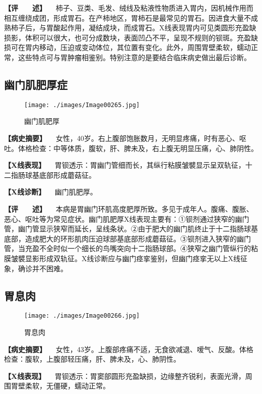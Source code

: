 \textbf{【评　　述】}
　柿子、豆类、毛发、绒线及粘液性物质进入胃内，因机械作用而相互缠绕成团，形成胃石。在产柿地区，胃柿石是最常见的胃石。因进食大量不成熟柿子后，与胃酸起作用，凝结成块，而成胃石。X线表现胃内可见类圆形充盈缺损影，体积可以很大，也可分成数块，表面凹凸不平，呈现不规则的钡斑。充盈缺损可在胃内移动，压迫或变动体位，其位置有变化。此外，周围胃壁柔软，蠕动正常，这些特点可与胃肿瘤相鉴别。特别注意的是要结合临床病史做出最后诊断。

\subsection{幽门肌肥厚症}

\begin{figure}[!htbp]
 \centering
 \texttt{[image: ./images/Image00265.jpg]}
 \captionsetup{justification=centering}
 \caption{幽门肌肥厚}
 \label{fig5-3-4}
  \end{figure} 

\textbf{【病史摘要】}
　女性，40岁。右上腹部饱胀数月，无明显疼痛，时有恶心、呕吐。体格检查：中等体质，腹软，肝、脾未及，右上腹无明显压痛，心、肺阴性。

\textbf{【X线表现】}
　胃钡透示：胃幽门管细而长，其纵行粘膜皱襞显示呈双轨征，十二指肠球基底部形成蘑菇征。

\textbf{【X线诊断】} 　幽门肌肥厚。

\textbf{【评　　述】}
　本病是胃幽门环肌高度肥厚所致。多见于成年人。腹痛、腹胀、恶心、呕吐等为常见症状。幽门肌肥厚X线表现主要有：①钡剂通过狭窄的幽门管，幽门管显示狭窄而延长，呈线条状。②由于肥大的幽门肌终止于十二指肠球基底部，造成肥大的环形肌肉压迫球部基底部形成蘑菇征。③钡剂进入狭窄的幽门管，当充盈不全时似一个细长的鸟嘴突向十二指肠球部。④狭窄之幽门管纵行的粘膜皱襞显影形成双轨征。X线诊断应与幽门痉挛鉴别，但幽门痉挛无以上X线征象，确诊并不困难。

\subsection{胃息肉}

\begin{figure}[!htbp]
 \centering
 \texttt{[image: ./images/Image00266.jpg]}
 \captionsetup{justification=centering}
 \caption{胃息肉}
 \label{fig5-3-5}
  \end{figure} 

\textbf{【病史摘要】}
　女性，43岁。上腹部疼痛不适，无食欲减退、嗳气、反酸。体格检查：腹软，上腹部轻压痛，肝、脾未及，心、肺阴性。

\textbf{【X线表现】}
　胃钡透示：胃窦部圆形充盈缺损，边缘整齐锐利，表面光滑，周围胃壁柔软，无僵硬，蠕动正常。

